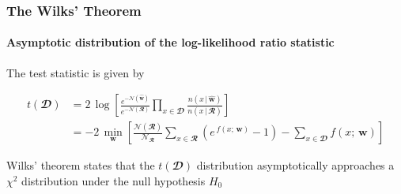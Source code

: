 \documentclass{beamer}
\begin{document}
	\begin{frame}
		\frametitle{The Wilks' Theorem}
		\framesubtitle{Asymptotic distribution of the log-likelihood ratio statistic}

		The test statistic is given by

		\begin{align*}
			t(\mathbfcal{D}) &= 2 \, \log \left[
			\frac{
				e^{-\mathcal{N}(\bm{\widehat{w}})}
			}{
				e^{-\mathcal{N}(\mathbfcal{R})}
			}
			\prod_{x \in \mathbfcal{D}}
			\frac{
				n(x\,|\,\bm{\widehat{w}})  
			}{
				n(x\,|\,\mathbfcal{R})
			}
		\right] \\
		& = 
		-2\,\min_{\bm{w}} 
		\left[
			\frac{
				\mathcal{N}(\mathbfcal{R})
			}{
				\mathcal{N}_{\mathbfcal{R}}
			}
			\sum_{x \in \mathbfcal{R}}
			\left(
				e^{\,f(x;\,\bm{{w}})} - 1
			\right)
			- \sum_{x \in \mathbfcal{D}}  f(x;\,\bm{{w}})
		\right] 
		\end{align*}

		\vfill

		Wilks' theorem states that the $t(\mathbfcal{D})$ distribution asymptotically approaches a \alert{$\chi^2$
		distribution} under the null hypothesis $H_0$

		
	\end{frame}
\end{document}
